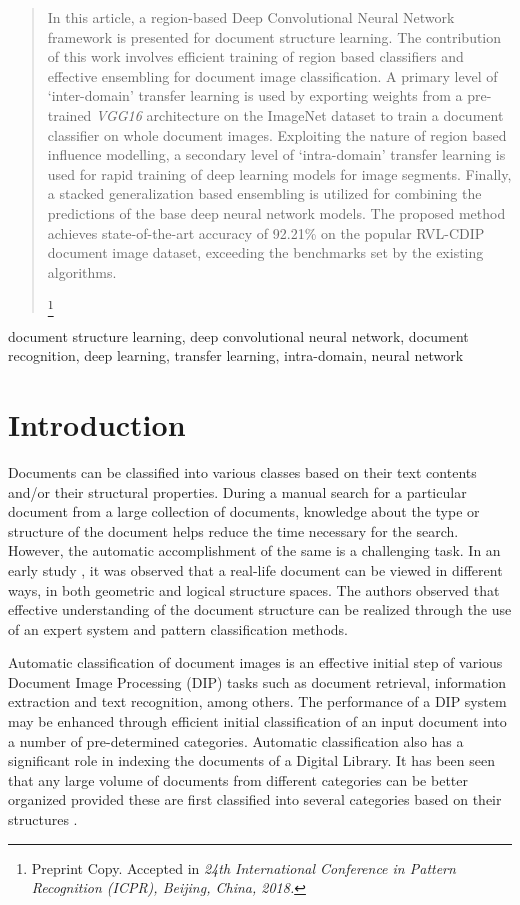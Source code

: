 \documentclass[10pt,conference,a4paper]{IEEEtran}
\newcommand\blfootnote[1]{%
	\begingroup
	\renewcommand\thefootnote{}\footnote{#1}%
	\addtocounter{footnote}{-1}%
	\endgroup
}
\begin{document}
\begin{abstract}
In this article, a region-based Deep Convolutional Neural Network framework is presented for document structure learning. The contribution of this work involves efficient training of region based classifiers and effective ensembling for document image classification. A primary level of `inter-domain' transfer learning is used by exporting weights from a pre-trained \textit{VGG16} architecture on the ImageNet dataset to train a document classifier on whole document images. Exploiting the nature of region based influence modelling, a secondary level of `intra-domain' transfer learning is used for rapid training of deep learning models for image segments. Finally, a stacked generalization based ensembling is utilized for combining the predictions of the base deep neural network models. The proposed method achieves state-of-the-art accuracy of 92.21\% on the popular RVL-CDIP document image dataset, exceeding the benchmarks set by the existing algorithms.

\blfootnote{Preprint Copy. Accepted in \textit{24th International Conference in Pattern Recognition (ICPR), Beijing, China, 2018.}}

\end{abstract}

\begin{IEEEkeywords}
document structure learning, deep convolutional neural network, document recognition, deep learning, transfer learning, intra-domain, neural network
\end{IEEEkeywords}

\section{Introduction}
Documents can be classified into various classes based on their text contents and/or their structural properties. During a manual search for a particular document from a large collection of documents, knowledge about the type or structure of the document helps reduce the time necessary for the search. However, the automatic accomplishment of the same is a challenging task. In an early study \cite{tang1991}, it was observed that a real-life document can be viewed in different ways, in both geometric and logical structure spaces. The authors observed that effective understanding of the document structure can be realized through the use of an expert system and pattern classification methods.

Automatic classification of document images is an effective initial step of various Document Image Processing (DIP) tasks such as document retrieval, information extraction and text recognition, among others. The performance of a DIP system may be enhanced through efficient initial classification of an input document into a number of pre-determined categories. Automatic classification also has a significant role in indexing the documents of a Digital Library. It has been seen that any large volume of documents from different categories can be better organized provided these are first classified into several categories based on their structures \cite{shin2001}.
\end{document}

